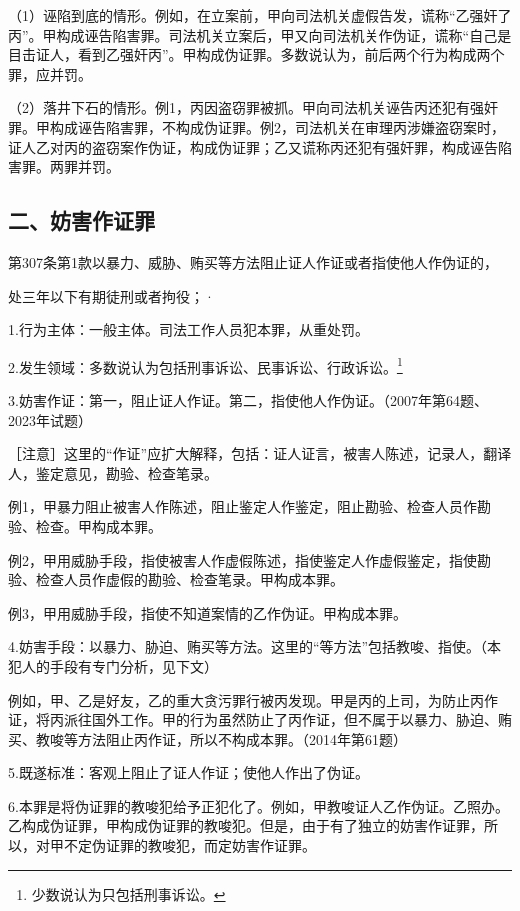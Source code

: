 （1）诬陷到底的情形。例如，在立案前，甲向司法机关虚假告发，谎称“乙强奸了丙”。甲构成诬告陷害罪。司法机关立案后，甲又向司法机关作伪证，谎称“自己是目击证人，看到乙强奸丙”。甲构成伪证罪。多数说认为，前后两个行为构成两个罪，应并罚。

（2）落井下石的情形。例1，丙因盗窃罪被抓。甲向司法机关诬告丙还犯有强奸罪。甲构成诬告陷害罪，不构成伪证罪。例2，司法机关在审理丙涉嫌盗窃案时，证人乙对丙的盗窃案作伪证，构成伪证罪；乙又谎称丙还犯有强奸罪，构成诬告陷害罪。两罪并罚。

\subsection*{二、妨害作证罪}

第307条第1款以暴力、威胁、贿买等方法阻止证人作证或者指使他人作伪证的，

处三年以下有期徒刑或者拘役；·

1.行为主体：一般主体。司法工作人员犯本罪，从重处罚。

2.发生领域：多数说认为包括刑事诉讼、民事诉讼、行政诉讼。\footnote{少数说认为只包括刑事诉讼。}

3.妨害作证：第一，阻止证人作证。第二，指使他人作伪证。（2007年第64题、2023年试题）

［注意］这里的“作证”应扩大解释，包括：证人证言，被害人陈述，记录人，翻译人，鉴定意见，勘验、检查笔录。

例1，甲暴力阻止被害人作陈述，阻止鉴定人作鉴定，阻止勘验、检查人员作勘验、检查。甲构成本罪。

例2，甲用威胁手段，指使被害人作虚假陈述，指使鉴定人作虚假鉴定，指使勘验、检查人员作虚假的勘验、检查笔录。甲构成本罪。

例3，甲用威胁手段，指使不知道案情的乙作伪证。甲构成本罪。

4.妨害手段：以暴力、胁迫、贿买等方法。这里的“等方法”包括教唆、指使。（本犯人的手段有专门分析，见下文）

例如，甲、乙是好友，乙的重大贪污罪行被丙发现。甲是丙的上司，为防止丙作证，将丙派往国外工作。甲的行为虽然防止了丙作证，但不属于以暴力、胁迫、贿买、教唆等方法阻止丙作证，所以不构成本罪。（2014年第61题）

5.既遂标准：客观上阻止了证人作证；使他人作出了伪证。

6.本罪是将伪证罪的教唆犯给予正犯化了。例如，甲教唆证人乙作伪证。乙照办。乙构成伪证罪，甲构成伪证罪的教唆犯。但是，由于有了独立的妨害作证罪，所以，对甲不定伪证罪的教唆犯，而定妨害作证罪。

